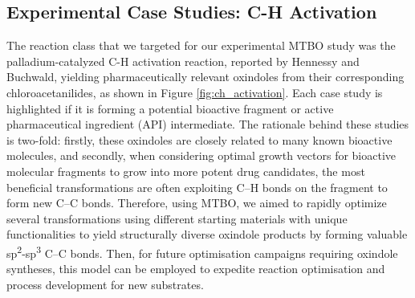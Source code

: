 \subsection{Experimental Case Studies: C-H Activation}

The reaction class that we targeted for our experimental MTBO study was the palladium-catalyzed C-H activation reaction, reported by Hennessy and Buchwald, yielding pharmaceutically relevant oxindoles  from their corresponding chloroacetanilides, as shown in Figure \ref{fig:ch_activation}. Each case study is highlighted if it is forming a potential bioactive fragment or active pharmaceutical ingredient (API) intermediate. The rationale behind these studies is two-fold: firstly, these oxindoles are closely related to many known bioactive molecules, and secondly, when considering optimal growth vectors for bioactive molecular fragments to grow into more potent drug candidates, the most beneficial transformations are often exploiting C--H bonds on the fragment to form new C--C bonds. Therefore, using MTBO, we aimed to rapidly optimize several transformations using different starting materials with unique functionalities to yield structurally diverse oxindole products by forming valuable sp\textsuperscript{2}-sp\textsuperscript{3} C--C bonds. Then, for future optimisation campaigns requiring oxindole syntheses, this model can be employed to expedite reaction optimisation and process development for new substrates.

